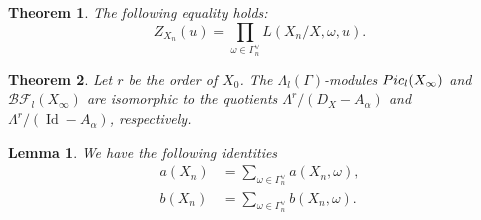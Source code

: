 \documentclass[10pt,a4paper]{amsart}
\newtheorem{lemma}{Lemma}
\newtheorem{theorem}{Theorem}
\newcommand{\BF}{\mathcal{BF}}
\DeclareMathOperator{\Id}{Id}
\begin{document}
\begin{theorem}
\label{Artin-formalism}
   The following equality holds:
    \[Z_{X_n}(u)=\prod_{\omega\in\Gamma_n^\vee}L(X_n/X,\omega,u).\]
\end{theorem}

\begin{theorem}
\label{char-udir}
Let $r$ be the order of $X_0$. The $\Lambda_l(\Gamma)$-modules ${\rm Pic}_{l}(X_{\infty})$ and $\BF_l(X_\infty)$ are isomorphic to the quotients $\Lambda^r/\left(D_X-A_\alpha\right)$ and $\Lambda^r/\left(\Id-A_\alpha\right)$, respectively.
\end{theorem}

\begin{lemma}
\label{formula-a,b}
    We have the following identities
    \begin{align*}
        a(X_n)&=\sum_{\omega\in \Gamma_n^\vee}a(X_n,\omega),\\
        b(X_n)&=\sum_{\omega\in \Gamma_n^\vee}b(X_n,\omega).
    \end{align*}
\end{lemma}
\end{document}
